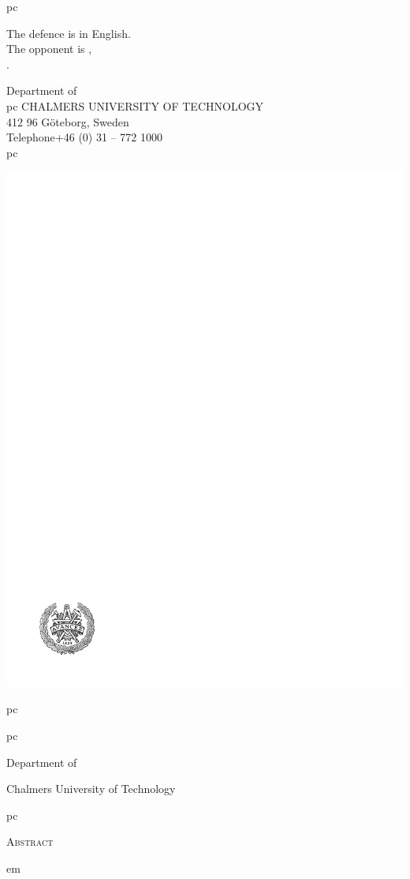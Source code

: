 \documentclass[12pt,a4paper,pdftex]{article}
\begin{document}
{   pc

  The defence is in English. \\
  The opponent is , \\
  . \\

  \vfill
  
  Department of \thesisdepartment \\
   pc
  {\scshape  CHALMERS UNIVERSITY OF TECHNOLOGY}\\
  412 96 Göteborg, Sweden\\
  Telephone\enskip+46 (0) 31 -- 772 1000\\
  
   pc

  \includegraphics[scale=1]{frontmatter/standard-images/Bildmarke30mm}\par
}

\clearpage


\thesistitle

\thesissubtitle

 pc

{\scshape\thesisauthor}
 pc

Department of \thesisdepartment

Chalmers University of Technology

 pc

{\large\scshape Abstract}
\vspace{1 pc}

 em
\setlength{\parskip}{0.5ex plus 0.5ex}  %

\noindent


\vfill
\end{document}

